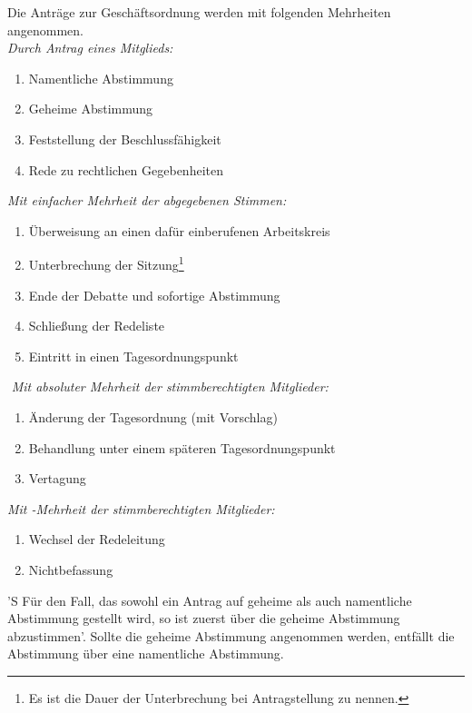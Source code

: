 \documentclass[%
	parskip=half,
]{scrartcl}
\newcounter{enumitem}
\newcommand{\edit}[1]{{\color{red} #1}}
\newcommand{\add}[1]{{\color{blue} #1}}
\begin{document}
\begin{contract}
Die Anträge zur Geschäftsordnung werden mit folgenden Mehrheiten angenommen. \\
\newline
\textit{Durch Antrag eines Mitglieds:}
\begin{enumerate}[\qquad a)]
	\item Namentliche Abstimmung
	\item Geheime Abstimmung
	\item Feststellung der Beschlussfähigkeit
	\item Rede zu rechtlichen Gegebenheiten
	\setcounter{enumitem}{\value{enumi}}
\end{enumerate}
\textit{Mit einfacher Mehrheit der abgegebenen Stimmen:}
\begin{enumerate}[\qquad a)]
	\setcounter{enumi}{\value{enumitem}}
	\item Überweisung \edit{an einen dafür einberufenen Arbeitskreis}
	\item Unterbrechung der Sitzung\footnote{\add{Es ist die Dauer der Unterbrechung bei Antragstellung zu nennen.}}
	\item Ende der Debatte und sofortige Abstimmung
	\item \edit{Schließung der Redeliste}
	\item Eintritt in einen Tagesordnungspunkt
	\setcounter{enumitem}{\value{enumi}}
\end{enumerate}​
\textit{Mit absoluter Mehrheit der stimmberechtigten Mitglieder:}
\begin{enumerate}[\qquad a)]
	\setcounter{enumi}{\value{enumitem}}
	\item Änderung der Tagesordnung (mit Vorschlag)
	\item Behandlung unter einem späteren Tagesordnungspunkt
	\item Vertagung
	\setcounter{enumitem}{\value{enumi}}
\end{enumerate}
\textit{Mit -Mehrheit der stimmberechtigten Mitglieder:}
\begin{enumerate}[\qquad a)]
	\setcounter{enumi}{\value{enumitem}}
	\item Wechsel der \edit{Redeleitung}
	\item Nichtbefassung
\end{enumerate}

'S Für den Fall, das sowohl ein Antrag auf geheime als auch namentliche Abstimmung gestellt wird, \edit{so ist} zuerst 
über die geheime Abstimmung \edit{abzustimmen}'. Sollte die geheime Abstimmung angenommen werden, entfällt \edit{die} 
Abstimmung über eine namentliche Abstimmung.


\end{contract}
\end{document}
